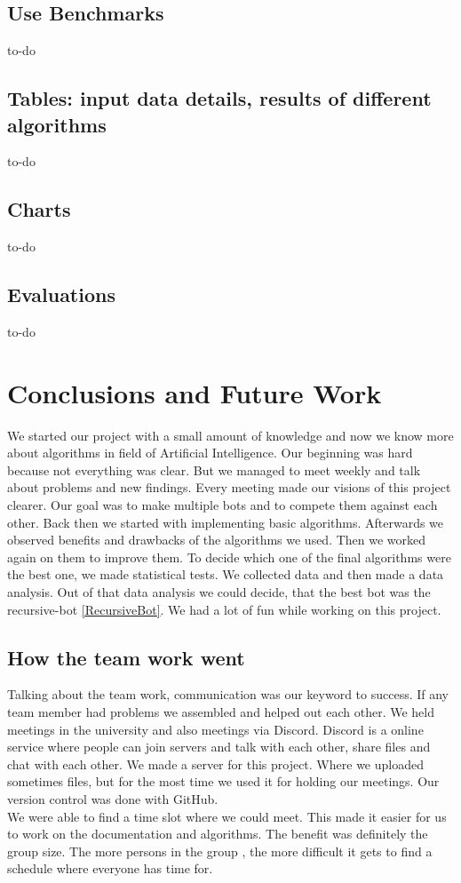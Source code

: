\documentclass[a4paper,12pt]{article}
\begin{document}
\subsection{Use Benchmarks}
to-do
\subsection{Tables: input data details, results of different algorithms}
to-do
\subsection{Charts}
to-do
\subsection{Evaluations}
to-do

\section{Conclusions and Future Work}
We started our project with a small amount of knowledge and now we know more about algorithms in field of Artificial Intelligence. Our beginning was hard because not everything was clear. But we managed to meet weekly and talk about problems and new findings. Every meeting made our visions of this project clearer. Our goal was to make multiple bots and to compete them against each other. Back then we started with implementing basic algorithms. Afterwards we observed benefits and drawbacks of the algorithms we used. Then we worked again on them to improve them. To decide which one of the final algorithms were the best one, we made statistical tests. We collected data and then made a data analysis. Out of that data analysis we could decide, that the best bot was the recursive-bot \ref{RecursiveBot}. We had a lot of fun while working on this project.
\subsection{How the team work went}
Talking about the team work, communication was our keyword to success. If any team member had problems we assembled and helped out each other. We held meetings in the university and also meetings via Discord. Discord is a online service where people can join servers and talk with each other, share files and chat with each other. We made a server for this project. Where we uploaded sometimes files, but for the most time we used it for holding our meetings. Our version control was done with GitHub.\\
We were able to find a time slot where we could meet. This made it easier for us to work on the documentation and algorithms. The benefit was definitely the group size. The more persons in the group , the more difficult it gets to find a schedule where everyone has time for.
\end{document}
